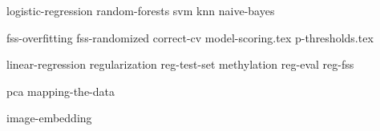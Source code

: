 \documentclass[symmetric, justified, a4paper, nofonts]{tufte-book}
\begin{document}

{logistic-regression}
{random-forests}
{svm}
{knn}
{naive-bayes}

{fss-overfitting}
{fss-randomized}
{correct-cv}
{model-scoring.tex}
{p-thresholds.tex}

{linear-regression}
{regularization}
{reg-test-set}
{methylation}
{reg-eval}
{reg-fss}


{pca}
{mapping-the-data}

{image-embedding}

\backmatter
\nocite{*}





\printindex
\end{document}
